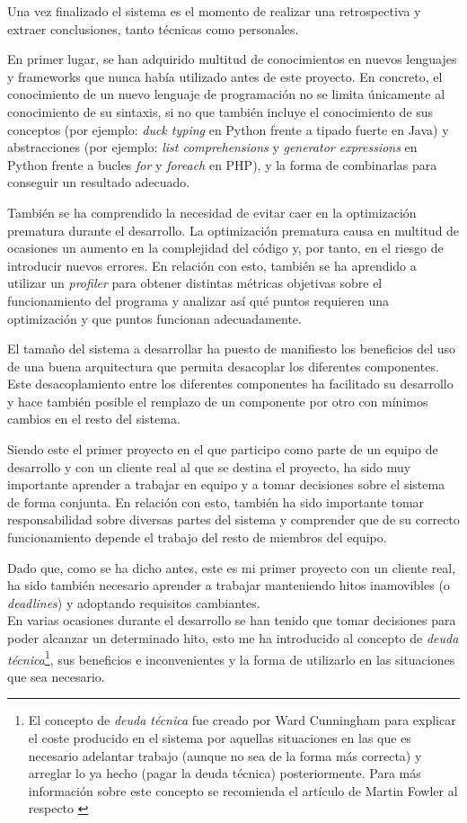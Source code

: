 Una vez finalizado el sistema es el momento de realizar una retrospectiva y extraer
conclusiones, tanto técnicas como personales.

En primer lugar, se han adquirido multitud de conocimientos en nuevos lenguajes y 
frameworks que nunca había utilizado antes de este proyecto.  En concreto, el 
conocimiento de un nuevo lenguaje de programación no se limita únicamente al 
conocimiento de su sintaxis, si no que también incluye el conocimiento
de sus conceptos (por ejemplo: \textit{duck typing} en Python frente a tipado fuerte en Java)
y abstracciones (por ejemplo: \textit{list comprehensions} y \textit{generator expressions} en Python frente a bucles \textit{for}
y \textit{foreach} en PHP), y la forma de combinarlas para conseguir un resultado
adecuado.

También se ha comprendido la necesidad de evitar caer en la optimización prematura
durante el desarrollo.  La optimización prematura causa en multitud de ocasiones 
un aumento en la complejidad del código y, por tanto, en el riesgo de introducir nuevos
errores.  En relación con esto, también se ha aprendido a utilizar un
\textit{profiler} para obtener distintas métricas objetivas sobre el funcionamiento del
programa y analizar así qué puntos requieren una optimización y que puntos 
funcionan adecuadamente.

El tamaño del sistema a desarrollar ha puesto de manifiesto los beneficios del
uso de una buena arquitectura que permita desacoplar los diferentes componentes.
Este desacoplamiento entre los diferentes componentes ha facilitado su desarrollo
y hace también posible el remplazo de un componente por otro con mínimos cambios
en el resto del sistema.

Siendo este el primer proyecto en el que participo como parte de un equipo de 
desarrollo y con un cliente real al que se destina el proyecto, ha sido muy
importante aprender a trabajar en equipo y a tomar decisiones sobre el sistema
de forma conjunta.  En relación con esto, también ha sido importante tomar
responsabilidad sobre diversas partes del sistema y comprender que de su correcto
funcionamiento depende el trabajo del resto de miembros del equipo.

Dado que, como se ha dicho antes, este es mi primer proyecto con un cliente real,
ha sido también necesario aprender a trabajar manteniendo hitos inamovibles 
(o \textit{deadlines}) y adoptando requisitos cambiantes.\\
En varias ocasiones durante el desarrollo se han tenido que tomar decisiones
para poder alcanzar un determinado hito, esto me ha introducido al concepto de
\textit{deuda técnica}\footnote{El concepto de \textit{deuda técnica} fue creado por
Ward Cunningham para explicar el coste producido en el sistema por aquellas situaciones
en las que es necesario adelantar trabajo (aunque no sea de la forma más correcta) y
arreglar lo ya hecho (pagar la deuda técnica) posteriormente.  Para más información
sobre este concepto se recomienda el artículo de Martin Fowler al respecto \cite{mfowler:technical_debt}},
sus beneficios e inconvenientes y la forma de utilizarlo en las situaciones que sea necesario.


